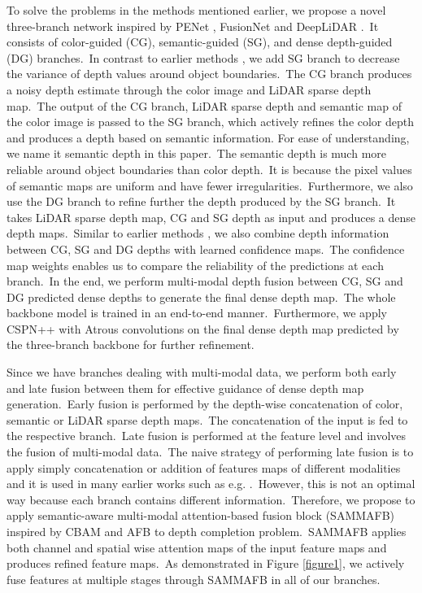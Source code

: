 \documentclass{ieeeaccess}
\begin{document}
To solve the problems in the methods mentioned earlier, we propose a novel three-branch network inspired by PENet \cite{hu2020PENet}, FusionNet \cite{vangansbeke2019sparse} and DeepLiDAR \cite{Qiu_2019_CVPR}.~It consists of color-guided (CG), semantic-guided (SG), and dense depth-guided (DG) branches.~In contrast to earlier methods \cite{Qiu_2019_CVPR,hu2020PENet,vangansbeke2019sparse}, we add SG branch to decrease the variance of depth values around object boundaries.~The CG branch produces a noisy depth estimate through the color image and LiDAR sparse depth map.~The output of the CG branch, LiDAR sparse depth and semantic map of the color image is passed to the SG branch, which actively refines the color depth and produces a depth based on semantic information. For ease of understanding, we name it semantic depth in this paper.~The semantic depth is much more reliable around object boundaries than color depth.~It is because the pixel values of semantic maps are uniform and have fewer irregularities.~Furthermore, we also use the DG branch to refine further the depth produced by the SG branch.~It takes LiDAR sparse depth map, CG and SG depth as input and produces a dense depth maps.~Similar to earlier methods \cite{hu2020PENet, zhao2021adaptive}, we also combine depth information between CG, SG and DG depths with learned confidence maps.~The confidence map weights enables us to compare the reliability of the predictions at each branch.~In the end, we perform multi-modal depth fusion between CG, SG and DG predicted dense depths to generate the final dense depth map.~The whole backbone model is trained in an end-to-end manner.~Furthermore, we apply CSPN++ with Atrous convolutions \cite{chen2017deeplab,hu2020PENet,cheng2020cspn++} on the final dense depth map predicted by the three-branch backbone for further refinement.



Since we have branches dealing with multi-modal data, we perform both early and late fusion between them for effective guidance of dense depth map generation.~Early fusion is performed by the depth-wise concatenation of color, semantic or LiDAR sparse depth maps.~The concatenation of the input is fed to the respective branch.~Late fusion is performed at the feature level and involves the fusion of multi-modal data.~The naive strategy of performing late fusion is to apply simply concatenation or addition of features maps of different modalities and it is used in many earlier works such as e.g.  \cite{tang2020learning, hu2020PENet, ma2019self}.~However, this is not an optimal way because each branch contains different information.~Therefore, we propose to apply semantic-aware multi-modal attention-based fusion block (SAMMAFB) inspired by CBAM \cite{woo2018cbam} and AFB \cite{fooladgar2019multi} to depth completion problem.~SAMMAFB applies both channel and spatial wise attention maps of the input feature maps and produces refined feature maps.~As demonstrated in Figure \ref{figure1}, we actively fuse features at multiple stages through SAMMAFB in all of our branches.
\end{document}
